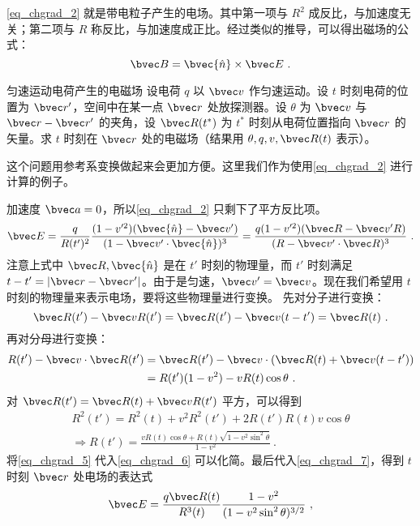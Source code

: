 \autoref{eq_chgrad_2}  就是带电粒子产生的电场。其中第一项与 $R^2$ 成反比，与加速度无关；第二项与 $R$ 称反比，与加速度成正比。经过类似的推导，可以得出磁场的公式：
\begin{equation}
\bvec B=\bvec{\hat n} \times \bvec E~.
\end{equation}
\begin{example}{匀速运动电荷产生的电磁场}
设电荷 $q$ 以 $\bvec v$ 作匀速运动。设 $t$ 时刻电荷的位置为 $\bvec r'$，空间中在某一点 $\bvec r$ 处放探测器。设 $\theta$ 为 $\bvec v$ 与 $\bvec r-\bvec r'$ 的夹角，设 $\bvec R(t^*)$ 为 $t^*$ 时刻从电荷位置指向 $\bvec r$ 的矢量。求 $t$ 时刻在 $\bvec r$ 处的电磁场（结果用 $\theta,q,v,\bvec R(t)$ 表示）。

这个问题用参考系变换做起来会更加方便。这里我们作为使用\autoref{eq_chgrad_2} 进行计算的例子。

加速度 $\bvec a=0$，所以\autoref{eq_chgrad_2} 只剩下了平方反比项。
\begin{equation}\label{eq_chgrad_7}
\bvec E=\frac{q}{R(t')^2}\frac{(1-v'^2)(\bvec{\hat n}-\bvec v')}{(1-\bvec v'\cdot \bvec{\hat n})^3}=\frac{q(1-v'^2)(\bvec R-\bvec v'R)}{(R-\bvec v'\cdot \bvec R)^3}~.
\end{equation}
注意上式中 $\bvec R,\bvec{\hat n}$ 是在 $t'$ 时刻的物理量，而 $t'$ 时刻满足 $t-t'=|\bvec r-\bvec r'|$。由于是匀速，$\bvec v'=\bvec v$。现在我们希望用 $t$ 时刻的物理量来表示电场，要将这些物理量进行变换。
先对分子进行变换：
\begin{equation}\label{eq_chgrad_4}
\bvec R(t')-\bvec vR(t')=\bvec R(t')-\bvec v(t-t')=\bvec R(t)~.
\end{equation}
再对分母进行变换：
\begin{equation}\label{eq_chgrad_6}
\begin{aligned}
R(t')-\bvec v\cdot \bvec R(t')&=\bvec R(t')-\bvec v\cdot(\bvec R(t)+\bvec v(t-t'))\\
&=R(t')(1-v^2)- v R(t)\cos\theta~.
\end{aligned}
\end{equation}
对 $\bvec R(t')=\bvec R(t)+\bvec vR(t')$ 平方，可以得到
\begin{equation}\label{eq_chgrad_5}
\begin{aligned}
R^2(t')=R^2(t)+v^2R^2(t')+2R(t')R(t)v\cos \theta\\
\Rightarrow R(t')=\frac{vR(t)\cos \theta+R(t)\sqrt{1-v^2\sin^2\theta}}{1-v^2}~.
\end{aligned}
\end{equation}
将\autoref{eq_chgrad_5} 代入\autoref{eq_chgrad_6}  可以化简。最后代入\autoref{eq_chgrad_7}，得到 $t$ 时刻 $\bvec r$ 处电场的表达式
\begin{equation}
\bvec E=\frac{q\bvec R(t)}{R^3(t)}\frac{1-v^2}{(1-v^2\sin^2\theta)^{3/2}}~,
\end{equation}


\end{example}

